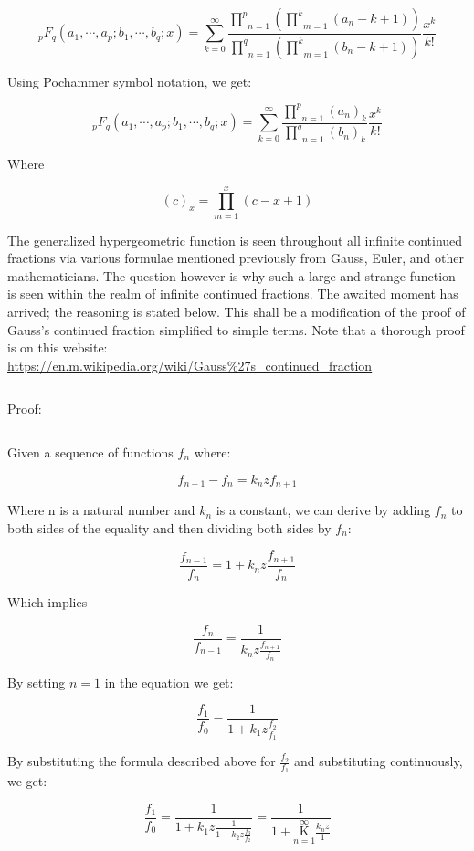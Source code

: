 \documentclass{article}
\begin{document}
$${}_p F_q (a_1,\cdots, a_p;b_1,\cdots,b_q;x) = \underset{k=0}{\overset{\infty}{\sum}} \frac{\underset{n=1}{\overset{p}{\prod}} (\underset{m=1}{\overset{k}{\prod}}(a_n-k+1))}{\underset{n=1}{\overset{q}{\prod}} (\underset{m=1}{\overset{k}{\prod}}(b_n-k+1))} \frac{x^k}{k!}$$

Using Pochammer symbol notation, we get:

$${}_p F_q (a_1,\cdots, a_p;b_1,\cdots,b_q;x) = \underset{k=0}{\overset{\infty}{\sum}} \frac{\underset{n=1}{\overset{p}{\prod}} (a_n)_k}{\underset{n=1}{\overset{q}{\prod}} (b_n)_k} \frac{x^k}{k!}$$

Where

$$(c)_x = \underset{m=1}{\overset{x}{\prod}}(c-x+1) $$

The generalized hypergeometric function is seen throughout all infinite continued fractions via various formulae mentioned previously from Gauss, Euler, and other mathematicians. The question however is why such a large and strange function is seen within the realm of infinite continued fractions. The awaited moment has arrived; the reasoning is stated below. This shall be a modification of the proof of Gauss’s continued fraction simplified to simple terms. Note that a thorough proof is on this website: \url{https://en.m.wikipedia.org/wiki/Gauss%27s_continued_fraction}

$${}$$

Proof:

$${}$$

Given a sequence of functions $f_n$ where:

$$f_{n-1} - f_n = k_n z f_{n+1}$$

Where n is a natural number and $k_n$ is a constant, we can derive by adding $f_n$ to both sides of the equality and then dividing both sides by $f_n$:

$$\frac{f_{n-1}}{f_n} = 1 + k_n z \frac{f_{n+1}}{f_n}$$

Which implies

$$\frac{f_n}{f_{n-1}} = \frac{1}{k_n z \frac{f_{n+1}}{f_n}}$$

By setting $n=1$ in the equation we get:

$$\frac{f_1}{f_{0}} = \frac{1}{1+k_1 z \frac{f_{2}}{f_1}}$$

By substituting the formula described above for $\frac{f_2}{f_1}$ and substituting continuously, we get:

$$\frac{f_1}{f_{0}} = \frac{1}{1+k_1 z \frac{1}{1+k_2 z \frac{f_{3}}{f_2}}} = \frac{1}{1+\underset{n=1}{\overset{\infty}{ \mathrm K}} \frac{k_n z}{1}}$$
\end{document}
